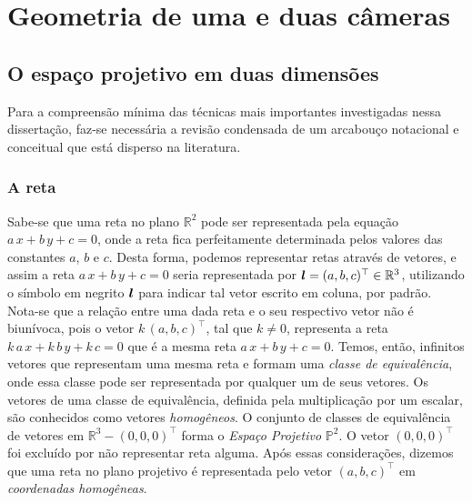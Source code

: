 \newpage
\chapter{Geometria de uma e duas câmeras}\label{sec.geo-1-2-cam}

\section{O espaço projetivo em duas dimensões}\label{sec.espaco-P2}

Para a compreensão mínima das técnicas mais importantes investigadas nessa dissertação, faz-se necessária a revisão condensada de um arcabouço notacional e conceitual que está disperso na literatura.

\subsection{A reta}\label{sec.reta}


Sabe-se que uma reta no plano $\mathbb{R}^{2}$ pode ser representada pela equação $a\,x+b\,y+c=0$, onde a reta fica perfeitamente determinada pelos valores das constantes $a$, $b$ e $c$. Desta forma, podemos representar retas através de vetores, e assim a reta $a\,x+b\,y+c=0$ seria representada por $\boldsymbol{l} = (a,b,c)^\top \in \mathbb{R}^{3}$, utilizando o símbolo em negrito $\boldsymbol{l}$ para indicar tal vetor escrito em coluna, por padrão. Nota-se que a relação entre uma dada reta e o seu respectivo vetor não é biunívoca, pois o vetor $k\,(a,b,c)^\top$, tal que $k\neq 0$, representa a reta $k\,a\,x+k\,b\,y+k\,c=0$ que é a mesma reta $a\,x+b\,y+c=0$. Temos, então, infinitos vetores que representam uma mesma reta e formam uma {\it classe de equivalência}, onde essa classe pode ser representada por qualquer um de seus vetores. Os vetores de uma classe de equivalência, definida pela multiplicação por um escalar, são conhecidos como vetores {\it homogêneos}. O conjunto de classes de equivalência de vetores em $\mathbb{R}^{3} - (0,0,0)^\top$ forma o {\it Espaço Projetivo} $\mathbb{P}^{2}$. O vetor $(0,0,0)^\top$ foi excluído por não representar reta alguma. Após essas considerações, dizemos que uma reta no plano projetivo é representada pelo vetor $(a,b,c)^\top$ em {\it coordenadas homogêneas}.\\
